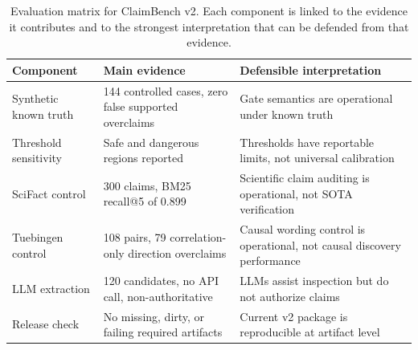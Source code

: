 \begin{table}[t]
\centering
\caption{Evaluation matrix for ClaimBench v2. Each component is linked to the evidence it contributes and to the strongest interpretation that can be defended from that evidence.}
\label{tab:evaluation-matrix}
\small
\begin{tabularx}{\textwidth}{p{}p{}X}
\toprule
Component & Main evidence & Defensible interpretation \\
\midrule
Synthetic known truth & 144 controlled cases, zero false supported overclaims & Gate semantics are operational under known truth \\
Threshold sensitivity & Safe and dangerous regions reported & Thresholds have reportable limits, not universal calibration \\
SciFact control & 300 claims, BM25 recall@5 of 0.899 & Scientific claim auditing is operational, not SOTA verification \\
Tuebingen control & 108 pairs, 79 correlation-only direction overclaims & Causal wording control is operational, not causal discovery performance \\
LLM extraction & 120 candidates, no API call, non-authoritative & LLMs assist inspection but do not authorize claims \\
Release check & No missing, dirty, or failing required artifacts & Current v2 package is reproducible at artifact level \\
\bottomrule
\end{tabularx}
\end{table}
